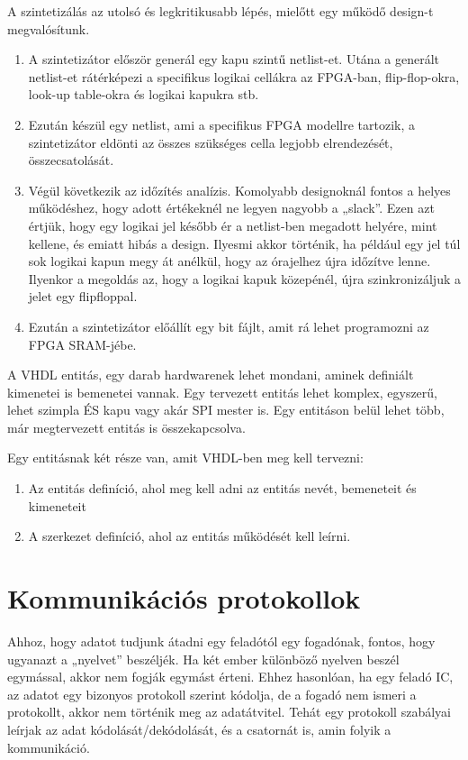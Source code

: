 \documentclass[a4paper,12pt,oneside]{book}
\begin{document}
A szintetizálás az utolsó és legkritikusabb lépés, mielőtt egy működő design-t megvalósítunk. 
\begin{enumerate}
	\item A szintetizátor először generál egy kapu szintű netlist-et. Utána a generált netlist-et rátérképezi a specifikus logikai cellákra az FPGA-ban, flip-flop-okra, look-up table-okra és logikai kapukra stb. 
	\item Ezután készül egy netlist, ami a specifikus FPGA modellre tartozik, a szintetizátor eldönti az összes szükséges cella legjobb elrendezését, összecsatolását. 
	\item Végül következik az időzítés analízis. Komolyabb designoknál fontos a helyes működéshez, hogy adott értékeknél ne legyen nagyobb a „slack”. Ezen azt értjük, hogy egy logikai jel később ér a netlist-ben megadott helyére, mint kellene, és emiatt hibás a design. Ilyesmi akkor történik, ha például egy jel túl sok logikai kapun megy át anélkül, hogy az órajelhez újra időzítve lenne. Ilyenkor a megoldás az, hogy a logikai kapuk közepénél, újra szinkronizáljuk a jelet egy flipfloppal.
	\item Ezután a szintetizátor előállít egy bit fájlt, amit rá lehet programozni az FPGA SRAM-jébe.  
\end{enumerate}
A VHDL entitás, egy darab hardwarenek lehet mondani, aminek definiált kimenetei is bemenetei vannak. Egy tervezett entitás lehet komplex, egyszerű, lehet szimpla ÉS kapu vagy akár SPI mester is. Egy entitáson belül lehet több, már megtervezett entitás is összekapcsolva. 

Egy entitásnak két része van, amit VHDL-ben meg kell tervezni: 
\begin{enumerate}
	\item Az entitás definíció, ahol meg kell adni az entitás nevét, bemeneteit és kimeneteit
	\item A szerkezet definíció, ahol az entitás működését kell leírni. 	  
\end{enumerate}

\section{Kommunikációs protokollok}
Ahhoz, hogy adatot tudjunk átadni egy feladótól egy fogadónak, fontos, hogy ugyanazt a „nyelvet” beszéljék. Ha két ember különböző nyelven beszél egymással, akkor nem fogják egymást érteni. Ehhez hasonlóan, ha egy feladó IC, az adatot egy bizonyos protokoll szerint kódolja, de a fogadó nem ismeri a protokollt, akkor nem történik meg az adatátvitel. Tehát egy protokoll szabályai leírjak az adat kódolását/dekódolását, és a csatornát is, amin folyik a kommunikáció. 
\end{document}
